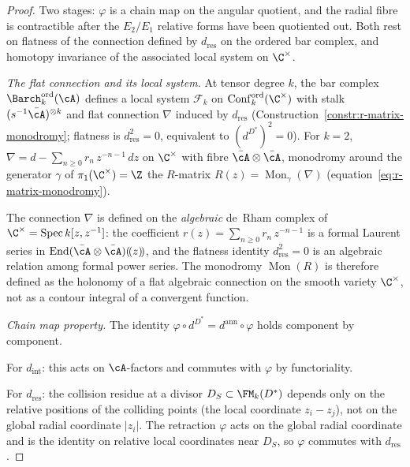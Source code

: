 \begin{proof}
Two stages: $\varphi$ is a chain map on the angular quotient, and the
radial fibre is contractible after the \(E_2/E_1\) relative forms have
been quotiented out. Both rest on flatness of the connection defined by
$d_{\mathrm{res}}$ on the ordered bar complex, and homotopy invariance
of the associated local system on $\C^\times$.

\emph{The flat connection and its local system.}
At tensor degree $k$, the bar complex
${\Barch}_k^{\mathrm{ord}}(\cA)$ defines a local
system $\mathcal{F}_k$ on
$\mathrm{Conf}_k^{\mathrm{ord}}(\C^\times)$ with
stalk $(s^{-1}\bar\cA)^{\otimes k}$ and flat
connection $\nabla$ induced by $d_{\mathrm{res}}$
(Construction~\ref{constr:r-matrix-monodromy};
flatness is $d_{\mathrm{res}}^2=0$, equivalent to $(d^{D^*})^2=0$). For $k=2$,
$\nabla=d-\sum_{n\ge 0}r_n\,z^{-n-1}\,dz$ on
$\C^\times$ with fibre $\bar\cA\otimes\bar\cA$,
monodromy around the generator $\gamma$ of
$\pi_1(\C^\times)=\Z$ the $R$-matrix
$R(z)=\operatorname{Mon}_\gamma(\nabla)$
(equation~\eqref{eq:r-matrix-monodromy}).

The connection $\nabla$ is defined on the
\emph{algebraic} de~Rham complex of
$\C^\times=\operatorname{Spec}k[z,z^{-1}]$: the
coefficient $r(z)=\sum_{n\ge 0}r_n\,z^{-n-1}$
is a formal Laurent series in
$\operatorname{End}(\bar\cA\otimes\bar\cA)(\!(z)\!)$,
and the flatness identity $d_{\mathrm{res}}^2=0$ is an
algebraic relation among formal power series.
The monodromy $\operatorname{Mon}(R)$ is therefore
defined as the holonomy of a flat algebraic
connection on the smooth variety $\C^\times$, not as a
contour integral of a convergent function.

\emph{Chain map property.}
The identity
\(\varphi\circ d^{D^*}=d^{\mathrm{ann}}\circ\varphi\)
holds component by component.

For $d_{\mathrm{int}}$: this acts on $\cA$-factors and commutes
with $\varphi$ by functoriality.

For $d_{\mathrm{res}}$: the collision residue at a divisor
$D_S\subset\FM_k(D^*)$ depends only on the relative positions
of the colliding points (the local coordinate
$z_i - z_j$), not on the global radial coordinate $|z_i|$.
The retraction $\varphi$ acts on the global radial coordinate
and is the identity on relative local coordinates near $D_S$,
so $\varphi$ commutes with $d_{\mathrm{res}}$.


\end{proof}
